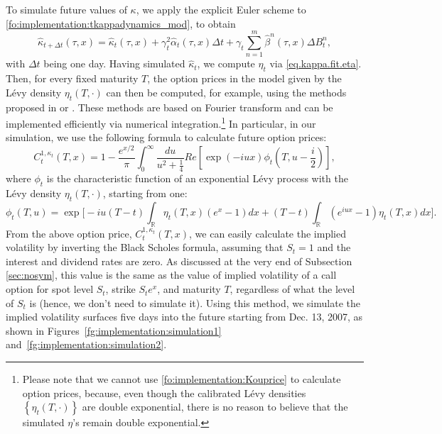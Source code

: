 \documentclass{article}
\numberwithin{equation}{section}
\newcommand\RR {\mathbb R}
\def\halpha{\hat{\alpha}}
\def\hbeta{\hat{\beta}}
\def\hkappa{\hat{\kappa}}
\begin{document}
To simulate future values of $\kappa$, we apply the explicit Euler scheme to \eqref{fo:implementation:tkappadynamics_mod}, to obtain
\begin{equation}\label{eq.detl.Euler}
\hkappa_{t+\Delta t}(\tau,x) = \hkappa_t(\tau,x) + \gamma_t^2 \halpha_t(\tau,x) \Delta t + \gamma_t\sum_{n=1}^m \hbeta^n(\tau,x) \Delta B^n_t,  
\end{equation} 
with $\Delta t$ being one day.
Having simulated $\hkappa_t$, we compute $\eta_t$ via \eqref{eq.kappa.fit.eta}. Then, for every fixed maturity $T$, the option prices in the model given by the L\'evy density $\eta_t(T,\cdot)$ can then be computed, for example, using the methods proposed in \cite{Carr99optionvaluation} or \cite{Lewis2001optionformula}. These methods are based on Fourier transform and can be implemented efficiently via numerical integration.\footnote{Please note that we cannot use \eqref{fo:implementation:Kouprice} to calculate option prices, because, even though the calibrated L\'{e}vy densities $\left\{\eta_t(T,\cdot)\right\}$ are double exponential, there is no reason to believe that the simulated $\eta$'s remain double exponential.}  
In particular, in our simulation, we use the following formula to calculate future option prices: 
\begin{equation}\label{fo:implementation:lewisopt}
C_t^{1,\kappa_t}(T,x) = 1 - \frac{e^{x/2}}{\pi} \int_0^\infty \frac{du}{u^2 + \frac{1}{4}} Re\left[\exp\left(-iu x\right) \phi_t\left(T,u-\frac{i}{2}\right)\right],
\end{equation}
where $\phi_t$ is the characteristic function of an exponential L\'{e}vy process with the L\'{e}vy density $\eta_t(T,\cdot)$, starting from one:
$$
\phi_t(T,u)  = \exp\bigg[ - iu (T-t)\int_\RR \eta_t(T,x)(e^x-1)dx  + (T-t)\int_\RR (e^{iux}-1) \eta_t(T,x)dx \bigg].  
$$
From the above option price, $C_t^{1,\kappa_t}(T,x)$, we can easily calculate the implied volatility by inverting the Black Scholes formula, assuming that $S_t=1$ and the interest and dividend rates are zero. As discussed at the very end of Subsection \ref{sec:nosym}, this value is the same as the value of implied volatility of a call option for spot level $S_t$, strike $S_t e^x$, and maturity $T$, regardless of what the level of $S_t$ is (hence, we don't need to simulate it).
Using this method, we simulate the implied volatility surfaces five days into the future starting from Dec. 13, 2007, as shown in Figures~\ref{fg:implementation:simulation1} and~\ref{fg:implementation:simulation2}. 
\end{document}
